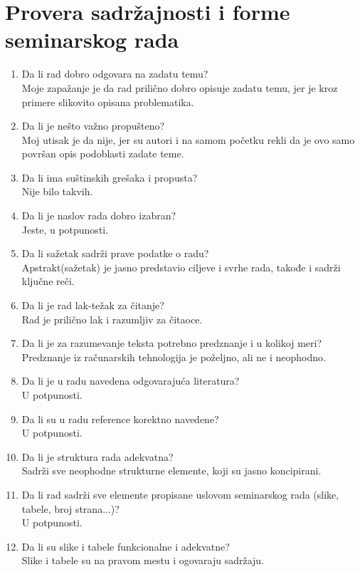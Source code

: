 \documentclass[a4paper]{report}
\begin{document}
\section{Provera sadržajnosti i forme seminarskog rada}

\begin{enumerate}
\item Da li rad dobro odgovara na zadatu temu?\\
Moje zapažanje je da rad prilično dobro opisuje zadatu temu, jer je kroz primere slikovito opisana problematika. 
\item Da li je nešto važno propušteno?\\
Moj utisak je da nije, jer su autori i na samom početku rekli da je ovo samo površan opis podoblasti zadate teme.
\item Da li ima suštinskih grešaka i propusta?\\
Nije bilo takvih.
\item Da li je naslov rada dobro izabran?\\
Jeste, u potpunosti.
\item Da li sažetak sadrži prave podatke o radu?\\
Apstrakt(sažetak) je jasno predstavio ciljeve i svrhe rada, takođe i sadrži ključne reči.
\item Da li je rad lak-težak za čitanje?\\
Rad je prilično lak i razumljiv za čitaoce.
\item Da li je za razumevanje teksta potrebno predznanje i u kolikoj meri?\\
Predznanje iz računarskih tehnologija je poželjno, ali ne i neophodno. 
\item Da li je u radu navedena odgovarajuća literatura?\\
U potpunosti.
\item Da li su u radu reference korektno navedene?\\
U potpunosti.
\item Da li je struktura rada adekvatna?\\
Sadrži sve neophodne strukturne elemente, koji su jasno koncipirani.
\item Da li rad sadrži sve elemente propisane uslovom seminarskog rada (slike, tabele, broj strana...)?\\
U potpunosti.
\item Da li su slike i tabele funkcionalne i adekvatne?\\
Slike i tabele su na pravom mestu i ogovaraju sadržaju.
\end{enumerate}
\end{document}
